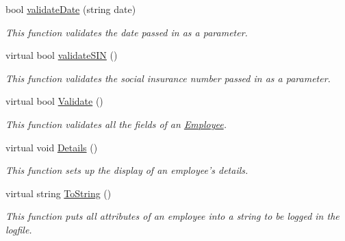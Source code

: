 \begin{DoxyCompactItemize}
bool \hyperlink{class_all_employees_1_1_employee_a1ff1d53ace5077357fc966d6194d5eff}{validate\-Date} (string date)
\begin{DoxyCompactList}\small\item\em This function validates the date passed in as a parameter. \end{DoxyCompactList}\item 
virtual bool \hyperlink{class_all_employees_1_1_employee_aeb9f8f33abe84d4334b5ac6bd2b827aa}{validate\-S\-I\-N} ()
\begin{DoxyCompactList}\small\item\em This function validates the social insurance number passed in as a parameter. \end{DoxyCompactList}\item 
virtual bool \hyperlink{class_all_employees_1_1_employee_ad40f5a6a835b161d5d7474b89e353dea}{Validate} ()
\begin{DoxyCompactList}\small\item\em This function validates all the fields of an \hyperlink{class_all_employees_1_1_employee}{Employee}. \end{DoxyCompactList}\item 
virtual void \hyperlink{class_all_employees_1_1_employee_af29171e5c95b4ac606ba556ef1f2d3bf}{Details} ()
\begin{DoxyCompactList}\small\item\em This function sets up the display of an employee's details. \end{DoxyCompactList}\item 
virtual string \hyperlink{class_all_employees_1_1_employee_acd4e78047e5e4d43e69559fb3f4ff541}{To\-String} ()
\begin{DoxyCompactList}\small\item\em This function puts all attributes of an employee into a string to be logged in the logfile. \end{DoxyCompactList}\end{DoxyCompactItemize}
